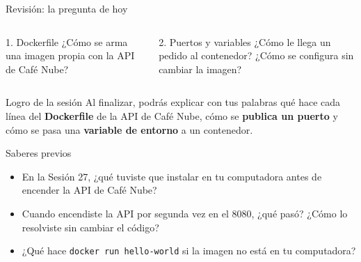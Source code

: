 \documentclass[aspectratio=169,10pt,c]{beamer}
\begin{document}
\begin{frame}{Revisión: la pregunta de hoy}
\begin{center}
\end{center}
\vspace{3mm}
\begin{columns}[T,onlytextwidth]
\begin{block}{1. Dockerfile}
\small ¿Cómo se arma una imagen propia con la API de Café Nube?
\end{block}
\begin{block}{2. Puertos y variables}
\small ¿Cómo le llega un pedido al contenedor? ¿Cómo se configura sin cambiar la imagen?
\end{block}
\end{columns}
\end{frame}

\begin{frame}[c]
\begin{block}{Logro de la sesión}
Al finalizar, podrás explicar con tus palabras qué hace cada línea del \textbf{Dockerfile} de la API de Café Nube, cómo se \textbf{publica un puerto} y cómo se pasa una \textbf{variable de entorno} a un contenedor.
\end{block}
\end{frame}

\begin{frame}{Saberes previos}
\begin{itemize}\setlength\itemsep{14pt}
  \item En la Sesión 27, ¿qué tuviste que instalar en tu computadora antes de encender la API de Café Nube?
  \item Cuando encendiste la API por segunda vez en el 8080, ¿qué pasó? ¿Cómo lo resolviste sin cambiar el código?
  \item ¿Qué hace \texttt{docker run hello-world} si la imagen no está en tu computadora?
\end{itemize}
\end{frame}
\end{document}
